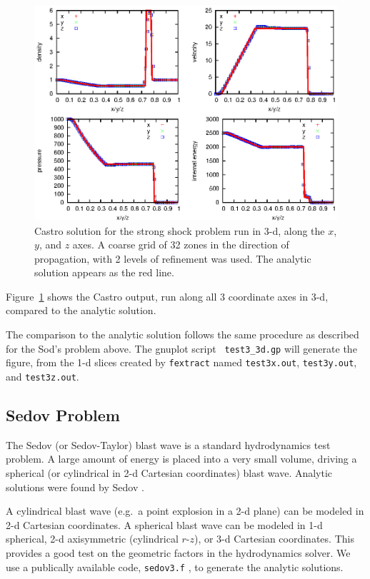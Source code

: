 \begin{figure}[t]
\centering
\includegraphics[width=5.0in]{CastroVerification/test3_3d}
\caption{\label{fig:test3} Castro solution for the strong shock
  problem run in 3-d, along the $x$, $y$, and $z$ axes.  A coarse grid
  of 32 zones in the direction of propagation, with 2 levels of
  refinement was used.  The analytic solution appears as the red
  line.}
\end{figure}

Figure~\ref{fig:test3} shows the Castro output, run along all 3
coordinate axes in 3-d, compared to the analytic solution.  

The comparison to the analytic solution follows the same procedure as
described for the Sod's problem above.  The gnuplot script {\tt
  test3\_3d.gp} will generate the figure, from the 1-d slices created by
{\tt fextract} named {\tt test3x.out}, {\tt test3y.out}, and {\tt test3z.out}.


\subsection{Sedov Problem}

The Sedov (or Sedov-Taylor) blast wave is a standard hydrodynamics
test problem.  A large amount of energy is placed into a very small
volume, driving a spherical (or cylindrical in 2-d Cartesian
coordinates) blast wave.  Analytic solutions were found by Sedov
\cite{sedov:1959}.  

A cylindrical blast wave (e.g.\ a point explosion in a 2-d plane) can
be modeled in 2-d Cartesian coordinates.  A spherical blast wave can
be modeled in 1-d spherical, 2-d axisymmetric (cylindrical $r$-$z$), or 3-d
Cartesian coordinates.  This provides a good test on the geometric
factors in the hydrodynamics solver.
We use a publically available code, {\tt sedov3.f}
\cite{timmes_sedov_code}, to generate the analytic solutions.

